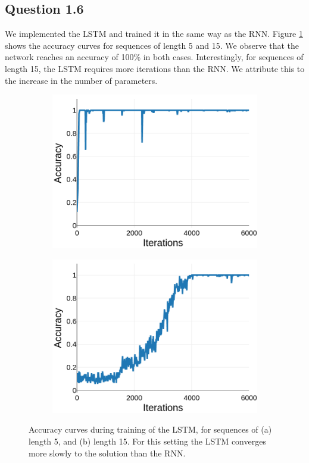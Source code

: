 \documentclass{article}
\begin{document}
\subsection*{Question 1.6}

We implemented the LSTM and trained it in the same way as the RNN. Figure \ref{fig:lstm_acc_curves} shows the accuracy curves for sequences of length 5 and 15. We observe that the network reaches an accuracy of 100\% in both cases. Interestingly, for sequences of length 15, the LSTM requires more iterations than the RNN. We attribute this to the increase in the number of parameters.


\begin{figure}[t]
\begin{subfigure}{0.49\textwidth}
\centering
\includegraphics[scale=0.22]{img/lstm-acc-L5}
\caption{}
\end{subfigure}
\begin{subfigure}{0.49\textwidth}
\centering
\includegraphics[scale=0.22]{img/lstm-acc-L15}
\caption{}
\end{subfigure}
 \caption{Accuracy curves during training of the LSTM, for sequences of (a) length 5, and (b) length 15. For this setting the LSTM converges more slowly to the solution than the RNN.}
\label{fig:lstm_acc_curves}
\end{figure}






\end{document}
